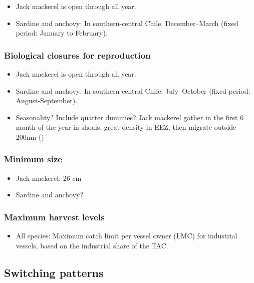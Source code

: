 \documentclass[
  11pt,
]{article}
\providecommand{\tightlist}{%
  \setlength{\itemsep}{0pt}\setlength{\parskip}{0pt}}
\begin{document}
\begin{itemize}
\tightlist
\item
  Jack mackerel is open through all year.
\item
  Sardine and anchovy: In southern-central Chile, December--March
  (fixed period: January to February).
\end{itemize}

\subsubsection{Biological closures for reproduction}\label{biological-closures-for-reproduction}

\begin{itemize}
\item
  Jack mackerel is open through all year.
\item
  Sardine and anchovy: In southern-central Chile, July--October (fixed
  period: August-September).
\item
  Seasonality? Include quarter dummies? Jack mackerel gather in the
  first 6 month of the year in shoals, great density in EEZ, then
  migrate outside 200nm ()
\end{itemize}

\subsubsection{Minimum size}\label{minimum-size}

\begin{itemize}
\tightlist
\item
  Jack mackerel: 26 cm
\item
  Sardine and anchovy?
\end{itemize}

\subsubsection{Maximum harvest levels}\label{maximum-harvest-levels}

\begin{itemize}
\tightlist
\item
  All species: Maximum catch limit per vessel owner (LMC) for industrial vessels, based on the industrial share of the TAC.
\end{itemize}

\subsection{Switching patterns}\label{switching-patterns}
\end{document}
